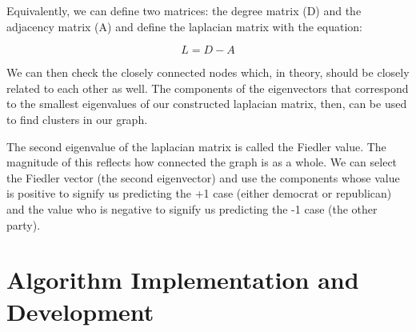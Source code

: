 \documentclass[11pt]{amsart}
\begin{document}
Equivalently, we can define two matrices: the degree matrix (D) and the adjacency matrix (A) and define the laplacian 
matrix with the equation:

\[L = D - A\]

We can then check the closely connected nodes which, in theory, should be 
closely related to each other as well. The components of the eigenvectors that correspond 
to the smallest eigenvalues of our constructed laplacian matrix, then, can be used 
to find clusters in our graph. 

The second eigenvalue of the laplacian matrix is called the Fiedler value. The magnitude of this 
reflects how connected the graph is as a whole. We can select the Fiedler vector (the second eigenvector)
and use the components whose value is positive to signify us predicting the +1 case (either democrat or republican)
and the value who is negative to signify us predicting the -1 case (the other party).

\section{Algorithm Implementation and Development}\label{sec:algorithms}


\end{document}
